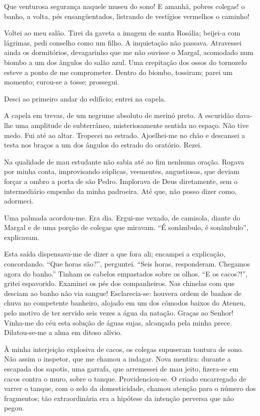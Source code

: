 Que venturosa segurança naquele museu do
sono! E amanhã, pobres colegas! o banho, a volta, pés ensangüentados,
listrando de vestígios vermelhos o caminho! 


\indent Voltei ao meu salão. Tirei
da gaveta a imagem de santa Rosália; beijei{}-a com lágrimas, pedi
conselho como um filho. A inquietação não passava. Atravessei ainda os
dormitórios, devagarinho que me não ouvisse o Margal, acomodado num
biombo a um dos ângulos do salão azul. Uma crepitação dos ossos do
tornozelo esteve a ponto de me comprometer. Dentro do biombo, tossiram;
parei um momento; curou{}-se a tosse; prossegui. 

Desci ao primeiro andar do edifício; entrei na capela. 

A capela em trevas, de um negrume
absoluto de merinó preto. A escuridão dava{}-lhe uma amplitude de
subterrâneo, misteriosamente sentida no espaço. Não tive medo. Fui até
ao altar. Tropecei no estrado. Ajoelhei{}-me no chão e descansei a
testa nos braços a um dos ângulos do estrado do oratório. Rezei. 

Na qualidade de mau estudante não sabia até ao fim nenhuma oração. Rogava
por minha conta, improvisando súplicas, veementes, angustiosas, 
que deviam forçar a ombro a porta de são Pedro. Implorava de Deus diretamente, sem o
intermediário empenho da minha padroeira. Até que, não posso dizer
como, adormeci. 

Uma palmada acordou{}-me. Era dia. Ergui{}-me vexado,
de camisola, diante do Margal e de uma porção de colegas que miravam.
``É sonâmbulo, é sonâmbulo'', explicavam. 

Esta saída dispensava{}-me de
dizer a que fora ali; encampei a explicação, concordando. ``Que horas
são?'', perguntei. ``Seis horas, responderam. Chegamos agora do banho.''
Tinham os cabelos empastados sobre os olhos. ``E os cacos?!'', gritei
espavorido. Examinei os pés dos companheiros. Nas chinelas com que
desciam ao banho não via sangue! Esclarecia{}-se: houvera ordem de
banhos de chuva no competente banheiro, alojado em um dos cômodos
baixos do Ateneu, pelo motivo de ter servido seis vezes a água da
natação. Graças ao Senhor! Vinha{}-me do céu esta solução de águas
sujas, alcançada pela minha prece. Dilatou{}-se{}-me a alma em ditoso alívio. 

À minha interjeição explosiva de cacos, os colegas supuseram
tontura de sono. Não assim o inspetor, que me chamou a indagar. Nova
mentira: durante a escapada dos sapotis, uma garrafa, que arremessei de
mau jeito, fizera{}-se em cacos contra o muro, sobre o tanque.
Providenciou{}-se. O criado encarregado de varrer o tanque, com o zelo
da domesticidade, chamou atenção para o número dos fragmentos; tão
extraordinária era a hipótese da intenção perversa que não pegou. 

